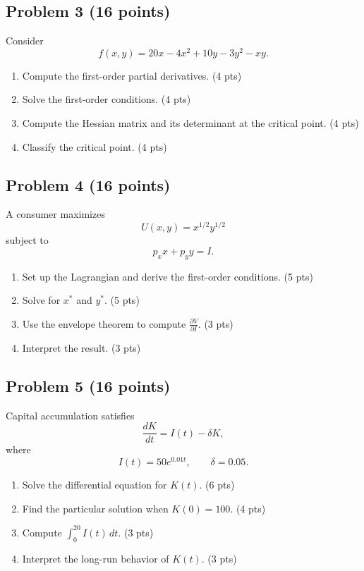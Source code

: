 \documentclass[12pt]{article}
\begin{document}
\subsection*{Problem 3 (16 points)}
Consider  
\[
f(x,y)=20x - 4x^2 + 10y - 3y^2 - xy.
\]

\begin{enumerate}
    \item Compute the first-order partial derivatives. \hfill (4 pts)
    \item Solve the first-order conditions. \hfill (4 pts)
    \item Compute the Hessian matrix and its determinant at the critical point. \hfill (4 pts)
    \item Classify the critical point. \hfill (4 pts)
\end{enumerate}
\newpage
\subsection*{Problem 4 (16 points)}
A consumer maximizes  
\[
U(x,y)=x^{1/2}y^{1/2}
\]
subject to
\[
p_x x + p_y y = I.
\]

\begin{enumerate}
    \item Set up the Lagrangian and derive the first-order conditions. \hfill (5 pts)
    \item Solve for \(x^*\) and \(y^*\). \hfill (5 pts)
    \item Use the envelope theorem to compute \(\frac{\partial V}{\partial I}\). \hfill (3 pts)
    \item Interpret the result. \hfill (3 pts)
\end{enumerate}

\subsection*{Problem 5 (16 points)}
Capital accumulation satisfies
\[
\frac{dK}{dt} = I(t) - \delta K,
\]
where
\[
I(t)=50 e^{0.01 t}, \qquad \delta = 0.05.
\]

\begin{enumerate}
    \item Solve the differential equation for \(K(t)\). \hfill (6 pts)
    \item Find the particular solution when \(K(0)=100\). \hfill (4 pts)
    \item Compute \(\displaystyle \int_0^{20} I(t)\, dt\). \hfill (3 pts)
    \item Interpret the long-run behavior of \(K(t)\). \hfill (3 pts)
\end{enumerate}
\end{document}
